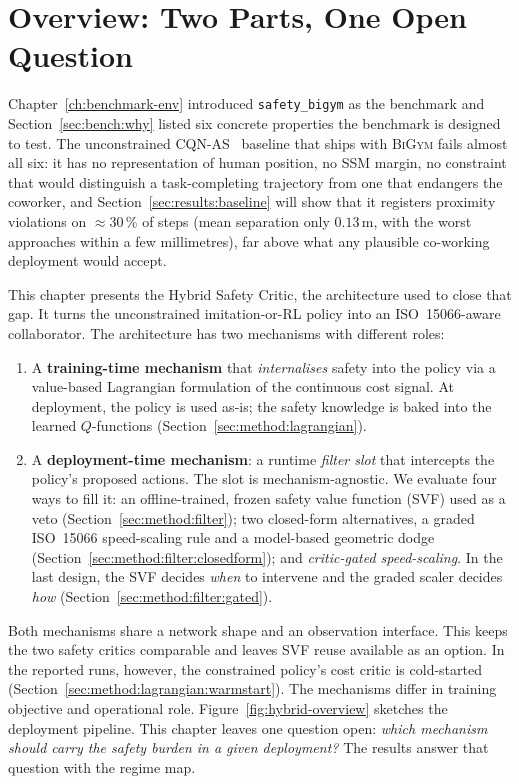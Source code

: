 \documentclass[11pt,a4paper]{report}
\newcommand{\ssm}{SSM}
\newcommand{\iso}{ISO~15066}
\newcommand{\bigym}{\textsc{BiGym}}
\newcommand{\sbigym}{\texttt{safety\_bigym}}
\newcommand{\cqnas}{CQN-AS}
\begin{document}
\section{Overview: Two Parts, One Open Question}
\label{sec:method:overview}

Chapter~\ref{ch:benchmark-env} introduced \sbigym{} as the
benchmark and Section~\ref{sec:bench:why} listed six concrete
properties the benchmark is designed to test. The unconstrained
\cqnas{}~\cite{seo2024cqnas} baseline that ships with \bigym{}
fails almost all six: it has no representation of human position,
no \ssm{} margin, no constraint that would distinguish a
task-completing trajectory from one that endangers the coworker,
and Section~\ref{sec:results:baseline} will show that it registers
proximity violations on $\approx$30\,\% of steps (mean separation only
$0.13$\,m, with the worst approaches within a few millimetres), far
above what any plausible co-working deployment would accept.

This chapter presents the Hybrid Safety Critic, the architecture used
to close that gap. It turns the unconstrained imitation-or-RL policy
into an \iso{}-aware collaborator. The architecture has two mechanisms
with different roles:

\begin{enumerate}[topsep=2pt,itemsep=2pt]
\item A \textbf{training-time mechanism} that \emph{internalises}
  safety into the policy via a value-based Lagrangian formulation
  of the continuous cost signal. At deployment, the policy is
  used as-is; the safety knowledge is baked into the learned
  $Q$-functions (Section~\ref{sec:method:lagrangian}).
\item A \textbf{deployment-time mechanism}: a runtime \emph{filter
  slot} that intercepts the policy's proposed actions. The slot is
  mechanism-agnostic. We evaluate four ways to fill it: an
  offline-trained, frozen safety value function (SVF) used as a veto
  (Section~\ref{sec:method:filter}); two closed-form alternatives, a
  graded \iso{} speed-scaling rule and a model-based geometric dodge
  (Section~\ref{sec:method:filter:closedform}); and
  \emph{critic-gated speed-scaling}. In the last design, the SVF
  decides \emph{when} to intervene and the graded scaler decides
  \emph{how} (Section~\ref{sec:method:filter:gated}).
\end{enumerate}

Both mechanisms share a network shape and an observation interface.
This keeps the two safety critics comparable and leaves SVF reuse
available as an option. In the reported runs, however, the constrained
policy's cost critic is cold-started
(Section~\ref{sec:method:lagrangian:warmstart}). The mechanisms differ
in training objective and operational role. Figure~\ref{fig:hybrid-overview}
sketches the deployment pipeline. This chapter leaves one question
open: \emph{which mechanism should carry the safety burden in a given
deployment?} The results answer that question with the regime map.
\end{document}
